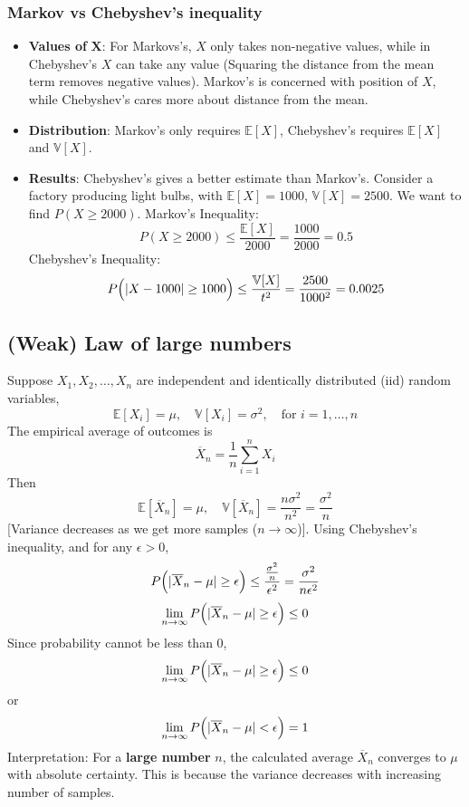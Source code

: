 \documentclass[../Probability.tex]{subfiles}
\begin{document}
\subsubsection{Markov vs Chebyshev's inequality}
\begin{itemize}
    \item \textbf{Values of } $\mathbf{X}$: For Markovs's, $X$ only takes non-negative values, while in Chebyshev's $X$ can take any value
    (Squaring the distance from the mean term removes negative values).
    Markov's is concerned with position of $X$, while Chebyshev's cares more about distance from the mean.
    \item \textbf{Distribution}: Markov's only requires $\mathbb{E}[X]$, Chebyshev's requires $\mathbb{E}[X]$ and $\mathbb{V}[X]$.
    \item \textbf{Results}: Chebyshev's gives a better estimate than Markov's.\newline
    Consider a factory producing light bulbs, with $\mathbb{E}[X]=1000$, $\mathbb{V}[X]=2500$.
    We want to find $P(X \geq 2000)$.\newline
    Markov's Inequality:
    \[P(X \geq 2000) \leq \frac{\mathbb{E}[X]}{2000} = \frac{1000}{2000} = 0.5\]
    Chebyshev's Inequality:
    \[P\Bigl(|X-1000| \geq 1000 \Bigr) \leq \frac{\mathbb{V}[X]}{t^2} = \frac{2500}{1000^2} = 0.0025\]
\end{itemize}

\subsection{(Weak) Law of large numbers}
Suppose $X_1, X_2, \ldots, X_n$ are independent and identically distributed (iid) random variables,
\[\mathbb{E}[X_i] = \mu,\quad \mathbb{V}[X_i] = \sigma^2,\quad \text{for } i = 1,\ldots,n\]
The empirical average of outcomes is
\[\overline{X}_n = \frac{1}{n}\sum_{i=1}^n X_i\]
Then
\[\mathbb{E}[\overline{X}_n] = \mu, \quad \mathbb{V}[\overline{X}_n] = \frac{n\sigma^2}{n^2} = \frac{\sigma^2}{n}\]
[Variance decreases as we get more samples ($n \to \infty$)].\newline
Using Chebyshev's inequality, and for any $\epsilon > 0$,
\[P \Bigl(|\overline{X}_n - \mu| \geq \epsilon \Bigr) \leq \frac{\frac{\sigma^2}{n}}{\epsilon^2} = \frac{\sigma^2}{n\epsilon^2}\]
\[\lim\limits_{n \to \infty} P \Bigl(|\overline{X}_n - \mu| \geq \epsilon \Bigr) \leq 0\]
Since probability cannot be less than 0,
\[\lim\limits_{n \to \infty} P \Bigl(|\overline{X}_n - \mu| \geq \epsilon \Bigr) \leq 0\]
or
\[\lim\limits_{n \to \infty} P \Bigl(|\overline{X}_n - \mu| < \epsilon \Bigr) = 1\]
Interpretation: For a \textbf{large number} $n$, the calculated average $\overline{X}_n$ converges to $\mu$ with absolute certainty.
This is because the variance decreases with increasing number of samples.
\end{document}
